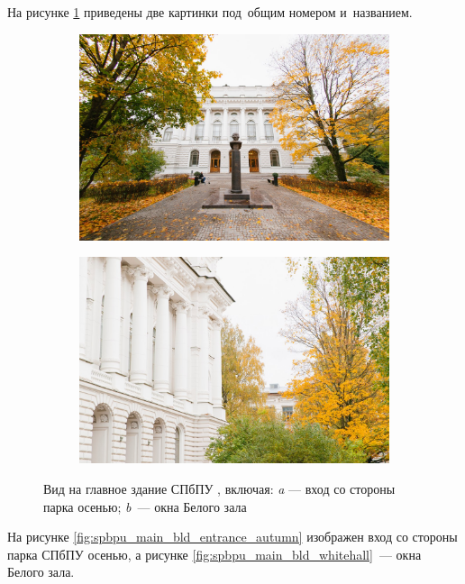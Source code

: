 На рисунке \ref{fig:spbpu_main_bld-two-photos} приведены две картинки под~общим номером и~названием.


\begin{figure}[!htbp]
	\begin{subfigure}[t]{\dimexpr.5\linewidth-1.3em\relax} %
		\includegraphics[height=0.20\textheight,valign=t]{my_folder/images//spbpu_main_bld_entrance_autumn} %
	\end{subfigure}
	\begin{subfigure}[t]{\dimexpr.5\linewidth-1.3em\relax}%
		\includegraphics[height=0.20\textheight,valign=t]{my_folder/images//spbpu_main_bld_whitehall}%
	\end{subfigure}
\captionsetup{justification=centering} %
	\caption{Вид на главное здание СПбПУ \cite{spbpu-gallery}, включая: {\itshape a} --- вход со стороны парка осенью; {\itshape b}~--- окна Белого зала}\label{fig:spbpu_main_bld-two-photos} 
\end{figure}

На рисунке \ref{fig:spbpu_main_bld_entrance_autumn} изображен вход со стороны парка СПбПУ осенью, а рисунке \ref{fig:spbpu_main_bld_whitehall}~--- окна Белого зала.